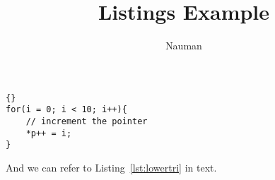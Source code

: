 \documentclass{article}
\begin{document}
\title{Listings Example}
\author{Nauman} 
\maketitle 

\lstset{language=c++}
\lstset{caption=Some C++ Code}
\begin{lstlisting}[frame=single]{}
for(i = 0; i < 10; i++){
    // increment the pointer
    *p++ = i;
}
\end{lstlisting}

\lstset{language=java,frame=single,basicstyle=\ttfamily,numbers=left}


And we can refer to Listing~\ref{lst:lowertri} in text.
\end{document}
